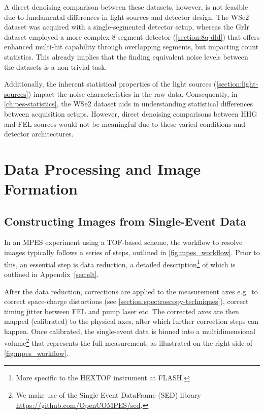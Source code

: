 A direct denoising comparison between these datasets, however, is not feasible due to fundamental differences in light sources and detector design. The \gls{WSe2} dataset was acquired with a single-segmented detector setup, whereas the \gls{GrIr} dataset employed a more complex 8-segment detector (\cref{section:8q-dld}) that offers enhanced multi-hit capability through overlapping segments, but impacting count statistics. This already implies that the finding equivalent noise levels between the datasets is a non-trivial task.

Additionally, the inherent statistical properties of the light sources (\cref{section:light-sources}) impact the noise characteristics in the raw data. Consequently, in \cref{ch:pes-statistics}, the \gls{WSe2} dataset aids in understanding statistical differences between acquisition setups. However, direct denoising comparisons between \gls{HHG} and \gls{FEL} sources would not be meaningful due to these varied conditions and detector architectures.

\section{Data Processing and Image Formation}
\subsection{Constructing Images from Single-Event Data}
In an \gls{MPES} experiment using a \gls{TOF}-based scheme, the workflow to resolve images typically follows a series of steps, outlined in \cref{fig:mpes_workflow}. Prior to this, an essential step is data reduction, a detailed description\footnote{More specific to the \gls{HEXTOF} instrument at \gls{FLASH}.} of which is outlined in Appendix~\ref{sec:elt}.

After the data reduction, corrections are applied to the measurement axes  e.g.\ to correct space-charge distortions (see \cref{section:spectroscopy-techniques}), correct timing jitter between \gls{FEL} and pump laser etc. The corrected axes are then mapped (calibrated) to the physical axes, after which further correction steps can happen. Once calibrated, the single-event data is binned into a multidimensional volume\footnote{We make use of the Single Event DataFrame (SED) library \href{https://github.com/OpenCOMPES/sed}{https://github.com/OpenCOMPES/sed}.} that represents the full measurement, as illustrated on the right side of \cref{fig:mpes_workflow}.

